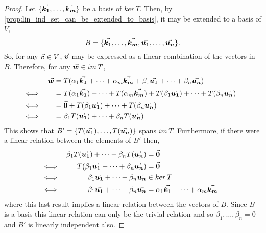 \documentclass[MathsNotesBase.tex]{subfiles}
\begin{document}
{		\bigskip
		\begin{proof}
			Let ${ \{\vec{\bm{k_1}}, \dots, \vec{\bm{k_m}}\} }$ be a basis of ${ ker\,T }$. Then, by \autoref{prop:lin_ind_set_can_be_extended_to_basis}, it may be extended to a basis of $V$,
			\[ B = \{\vec{\bm{k_1}}, \dots, \vec{\bm{k_m}}, \vec{\bm{u_1}}, \dots, \vec{\bm{u_n}}\}. \]
			So, for any ${ \vec{\bm{v}} \in V }$, $\vec{\bm{v}}$ may be expressed as a linear combination of the vectors in $B$. Therefore, for any ${ \vec{\bm{w}} \in im\,T }$,
			\begin{align*}
			&& \vec{\bm{w}} &= T(\alpha_1\vec{\bm{k_1}} + \cdots + \alpha_m\vec{\bm{k_m}} + \beta_1\vec{\bm{u_1}} + \cdots + \beta_n\vec{\bm{u_n}})  \\
			&\iff &  &= T(\alpha_1\vec{\bm{k_1}}) + \cdots + T(\alpha_m\vec{\bm{k_m}}) + T(\beta_1\vec{\bm{u_1}}) + \cdots + T(\beta_n\vec{\bm{u_n}}) &\\
			&\iff &  &= \vec{\bm{0}} + T(\beta_1\vec{\bm{u_1}}) + \cdots + T(\beta_n\vec{\bm{u_n}})   &\text{\scriptsize{}} \\
			&\iff &  &= \beta_1T(\vec{\bm{u_1}}) + \cdots + \beta_nT(\vec{\bm{u_n}})   &\text{\scriptsize{}} \\
			\end{align*}
			This shows that ${ B' = \{T(\vec{\bm{u_1}}), \dots, T(\vec{\bm{u_n}})\} }$ spans $im\,T$. Furthermore, if there were a linear relation between the elements of $B'$ then,
			\begin{align*}
			&& \beta_1T(\vec{\bm{u_1}}) + \cdots + \beta_nT(\vec{\bm{u_n}}) &= \vec{\bm{0}} \\
			&\iff & T(\beta_1\vec{\bm{u_1}} + \cdots + \beta_n\vec{\bm{u_n}}) &= \vec{\bm{0}} & \\
			&\iff & \beta_1\vec{\bm{u_1}} + \cdots + \beta_n\vec{\bm{u_n}} &\in ker\,T &\text{\scriptsize{}} \\
			&\iff & \beta_1\vec{\bm{u_1}} + \cdots + \beta_n\vec{\bm{u_n}} &= \alpha_1\vec{\bm{k_1}} + \cdots + \alpha_m\vec{\bm{k_m}} &\text{\scriptsize{}} \\
			\end{align*}
			where this last result implies a linear relation between the vectors of $B$. Since $B$ is a basis this linear relation can only be the trivial relation and so ${ \beta_1, \dots, \beta_n = 0 }$ and $B'$ is linearly independent also.
		\end{proof}
		
}
\end{document}
